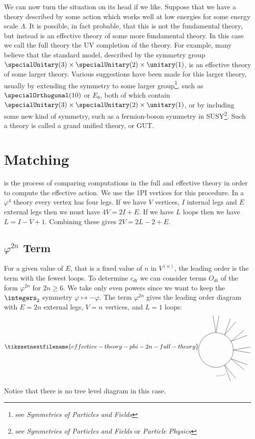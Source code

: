 \documentclass[fleqn]{NotesClass}
\newcommand*{\course}[1]{\textit{#1}}
\begin{document}
    We can now turn the situation on its head if we like.
    Suppose that we have a theory described by some action which works well at low energies for some energy scale \(\Lambda\).
    It is possible, in fact probable, that this is not the fundamental theory, but instead is an effective theory of some more fundamental theory.
    In this case we call the full theory the UV completion of the theory.
    For example, many believe that the standard model, described by the symmetry group \(\specialUnitary(3) \times \specialUnitary(2) \times \unitary(1)\), is an effective theory of some larger theory.
    Various suggestions have been made for this larger theory, usually by extending the symmetry to some larger group\footnote{see \course{Symmetries of Particles and Fields}}, such as \(\specialOrthogonal(10)\) or \(E_8\), both of which contain \(\specialUnitary(3) \times \specialUnitary(2) \times \unitary(1)\), or by including some new kind of symmetry, such as a fermion-boson symmetry in SUSY\footnote{see \course{Symmetries of Particles and Fields} or \course{Particle Physics}}.
    Such a theory is called a grand unified theory, or GUT.
    
    \section{Matching}
     is the process of comparing computations in the full and effective theory in order to compute the effective action.
    We use the 1PI vertices for this procedure.
    In a \(\varphi^4\) theory every vertex has four legs.
    If we have \(V\) vertices, \(I\) internal legs and \(E\) external legs then we must have \(4V = 2I + E\).
    If we have \(L\) loops then we have \(L = I - V + 1\).
    Combining these gives \(2V = 2L - 2 + E\).
    
    \subsection{\texorpdfstring{\(\varphi^{2n}\)}{phi-2n} Term}
    For a given value of \(E\), that is a fixed value of \(n\) in \(V^{(n)}\), the leading order is the term with the fewest loops.
    To determine \(c_{di}\) we can consider terms \(O_{di}\) of the form \(\varphi^{2n}\) for \(2n \ge 6\).
    We take only even powers since we want to keep the \(\integers_2\) symmetry \(\varphi \mapsto -\varphi\).
    The term \(\varphi^{2n}\) gives the leading order diagram with \(E = 2n\) external legs, \(V = n\) vertices, and \(L = 1\) loops:
    \begin{equation}
        \tikzsetnextfilename{effective-theory-phi-2n-full-theory}
        \begin{tikzpicture}[baseline=(current bounding box)]
            \draw (0, 0) circle [radius = 1cm];
            \foreach \angle in {90, 60, ..., -60} {
                \draw (\angle:1) -- ++ (\angle+10:1);
                \draw (\angle:1) -- ++ (\angle-10:1);
            }
            \draw[dotted, thick] (-70:1.5) arc (-70:-90:1.5);
        \end{tikzpicture}
    \end{equation}
    Notice that there is no tree level diagram in this case.
    
\end{document}
